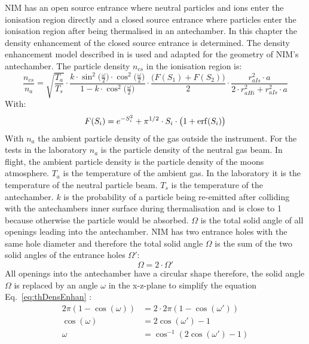 	NIM has an open source entrance where neutral particles and ions enter the ionisation region directly and a closed source entrance where particles enter the ionisation region after being thermalised in an antechamber. In this chapter the density enhancement of the closed source entrance is determined. The density enhancement model described in \cite{DensEnhan_Wurz_07} is used and adapted for the geometry of NIM's antechamber. The particle density $n_{cs}$ in the ionisation region is:
	\begin{equation}
		\frac{n_{cs}}{n_a} = \sqrt{\frac{T_a}{T_s}}\cdot\frac{k\cdot \sin^2\big(\frac{\omega}{2}\big)\cdot \cos^2\big(\frac{\omega}{2}\big)}{1-k\cdot \cos^2\big(\frac{\omega}{2}\big)}\cdot\frac{\big(F(S_1)+ F(S_2)\big)}{2} \cdot \frac{r_{aIs}^2\cdot a}{2\cdot r_{aHi}^2 + r_{aIs}^2\cdot a}
		\label{eq:thDensEnhan}
	\end{equation}
	With:
	\begin{equation}
		F(S_i) = e^{-S_i^2} + \pi^{1/2}\cdot S_i\cdot\big(1 + {\rm erf}(S_i)\big)
		\label{eq:F(S)}
	\end{equation}
	With $n_a$ the ambient particle density of the gas outside the instrument. For the tests in the laboratory $n_a$ is the particle density of the neutral gas beam. In flight, the ambient particle density is the particle density of the moons atmosphere. $T_a$ is the temperature of the ambient gas. In the laboratory it is the temperature of the neutral particle beam. $T_s$ is the temperature of the antechamber. $k$ is the probability of a particle being re-emitted after colliding with the antechambers inner surface during thermalisation and is close to 1 because otherwise the particle would be absorbed. $\Omega$ is the total solid angle of all openings leading into the antechamber. NIM has two entrance holes with the same hole diameter and therefore the total solid angle $\Omega$ is the sum of the two solid angles of the entrance holes $\Omega'$:
	\begin{equation}
		\Omega = 2\cdot\Omega'
	\end{equation}
	All openings into the antechamber have a circular shape therefore, the solid angle $\Omega$ is replaced by an angle $\omega$ in the x-z-plane to simplify the equation Eq.~\eqref{eq:thDensEnhan} \cite{Hedin_1964}: 
	\begin{align}
		2\pi(1- \cos(\omega)) &= 2\cdot 2\pi(1- \cos(\omega'))\\
		\cos(\omega) &= 2\cos(\omega') -1\\
		\omega &= \cos^{-1}(2\cos(\omega') -1)
	\end{align}
